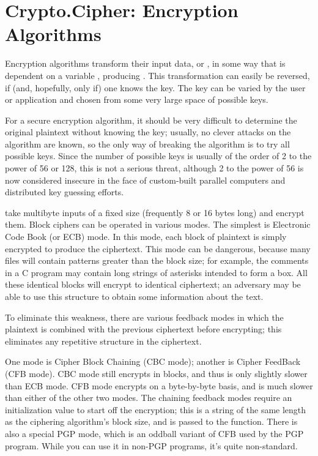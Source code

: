 \documentclass{howto}
\begin{document}
\section{Crypto.Cipher: Encryption Algorithms}

Encryption algorithms transform their input data, or ,
in some way that is dependent on a variable , producing
. This transformation can easily be reversed, if (and,
hopefully, only if) one knows the key.  The key can be varied by the
user or application and chosen from some very large space of possible
keys.

For a secure encryption algorithm, it should be very difficult to
determine the original plaintext without knowing the key; usually, no
clever attacks on the algorithm are known, so the only way of breaking
the algorithm is to try all possible keys. Since the number of possible
keys is usually of the order of 2 to the power of 56 or 128, this is not
a serious threat, although 2 to the power of 56 is now considered
insecure in the face of custom-built parallel computers and distributed
key guessing efforts.

 take multibyte inputs of a fixed size
(frequently 8 or 16 bytes long) and encrypt them.  Block ciphers can
be operated in various modes.  The simplest is Electronic Code Book
(or ECB) mode.  In this mode, each block of plaintext is simply
encrypted to produce the ciphertext.  This mode can be dangerous,
because many files will contain patterns greater than the block size;
for example, the comments in a C program may contain long strings of
asterisks intended to form a box.  All these identical blocks will
encrypt to identical ciphertext; an adversary may be able to use this
structure to obtain some information about the text.

To eliminate this weakness, there are various feedback modes in which
the plaintext is combined with the previous ciphertext before
encrypting; this eliminates any repetitive structure in the
ciphertext.   

One mode is Cipher Block Chaining (CBC mode); another is Cipher
FeedBack (CFB mode).  CBC mode still encrypts in blocks, and thus is
only slightly slower than ECB mode.  CFB mode encrypts on a
byte-by-byte basis, and is much slower than either of the other two
modes.  The chaining feedback modes require an initialization value to
start off the encryption; this is a string of the same length as the
ciphering algorithm's block size, and is passed to the 
function.  There is also a special PGP mode, which is an oddball
variant of CFB used by the PGP program.  While you can use it in
non-PGP programs, it's quite non-standard.
\end{document}
